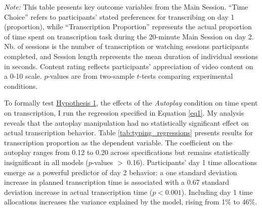 \documentclass[11pt,a4paper,oneside]{article}
\begin{document}
\begin{table}[H]
{\begin{threeparttable}
\begin{tabular}{@{}lcc c@{}}
  \bottomrule
  \end{tabular}
  \begin{tablenotes}[flushleft]
  \footnotesize
  \item[] \textit{Note:} This table presents key outcome variables from the Main Session. ``Time Choice'' refers to participants' stated preferences for transcribing on day 1 (proportion), while ``Transcription Proportion'' represents the actual proportion of time spent on transcription task during the 20-minute Main Session on day 2. Nb. of sessions is the number of transcription or watching sessions participants completed, and Session length represents the mean duration of individual sessions in seconds. Content rating reflects participants' appreciation of video content on a 0-10 scale. $p$-values are from two-sample $t$-tests comparing experimental conditions.
  \end{tablenotes}
  \end{threeparttable} \label{table3}
 }
\end{table}

To formally test \hyperref[hypotheses]{Hypothesis 1}, the effects of the \textit{Autoplay} condition on time spent on transcription, I run the regression specified in Equation \ref{eq1}. My analysis reveals that the autoplay manipulation had no statistically significant effect on actual transcription behavior. Table \ref{tab:typing_regressions} presents results for transcription proportion as the dependent variable. The coefficient on the autoplay ranges from 0.12 to 0.20 across specifications but remains statistically insignificant in all models ($p$-values $>$ 0.16). Participants' day 1 time allocations emerge as a powerful predictor of day 2 behavior: a one standard deviation increase in planned transcription time is associated with a 0.67 standard deviation increase in actual transcription time ($p < 0.001$). Including day 1 time allocations increases the variance explained by the model, rising from 1\% to 46\%.
\end{document}

